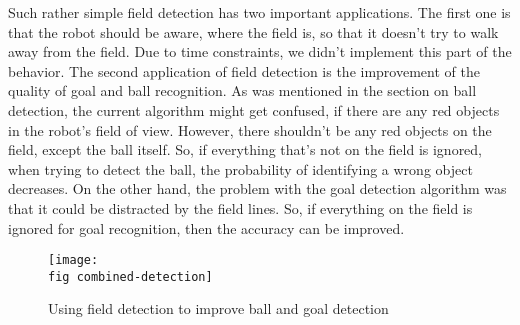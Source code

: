 Such rather simple field detection has two important applications. The first
one is that the robot should be aware, where the field is, so that it doesn't
try to walk away from the field. Due to time constraints, we didn't implement
this part of the behavior. The second application of field detection is the
improvement of the quality of goal and ball recognition. As was mentioned in
the section on ball detection, the current algorithm might get confused, if
there are any red objects in the robot's field of view. However, there
shouldn't be any red objects on the field, except the ball itself. So, if
everything that's not on the field is ignored, when trying to detect the ball,
the probability of identifying a wrong object decreases. On the other hand, the
problem with the goal detection algorithm was that it could be distracted by
the field lines. So, if everything on the field is ignored for goal
recognition, then the accuracy can be improved.

\begin{figure}[ht]
  \texttt{[image: \\fig combined-detection]}
  \caption{Using field detection to improve ball and goal detection}
  \label{p figure combined-detection}
\end{figure}
